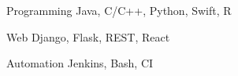 

\begin{cvskills}

  \cvskill
    {Programming} %
    {Java, C/C++, Python, Swift, R} %

  \cvskill
    {Web} %
    {Django, Flask, REST, React} %
    
  \cvskill
    {Automation}
    {Jenkins, Bash, CI}

\end{cvskills}